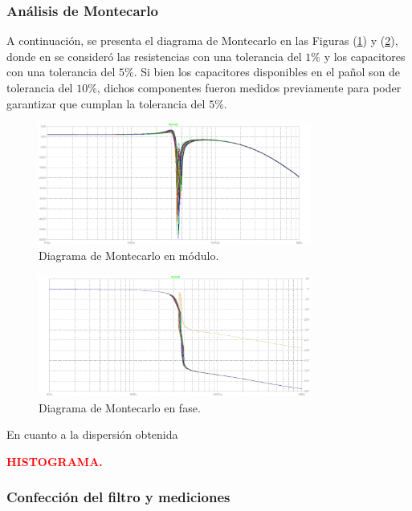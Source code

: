 \subsubsection{Análisis de Montecarlo}
A continuación, se presenta el diagrama de Montecarlo en las Figuras (\ref{fig:mc-mod}) y (\ref{fig:mc-pha}), donde en se consideró las resistencias con una tolerancia del $1\%$ y los capacitores con una tolerancia del $5\%$. Si bien los capacitores disponibles en el pañol son de tolerancia del $10\%$, dichos componentes fueron medidos previamente para poder garantizar que cumplan la tolerancia del $5\%$.
\begin{figure}[H]
\centering
	\includegraphics[width=0.8\textwidth]{ImagenesEjercicio4/MC-Mod-1.png}
	\caption{Diagrama de Montecarlo en módulo.}
	\label{fig:mc-mod}
\end{figure}
\begin{figure}[H]
\centering
	\includegraphics[width=0.8\textwidth]{ImagenesEjercicio4/MC-Pha-1.png}
	\caption{Diagrama de Montecarlo en fase.}
	\label{fig:mc-pha}
\end{figure}

En cuanto a la dispersión obtenida

\begin{center}
	\Large{\textbf{\textcolor{red}{HISTOGRAMA.}}}
\end{center}


\subsubsection{Confección del filtro y mediciones}

